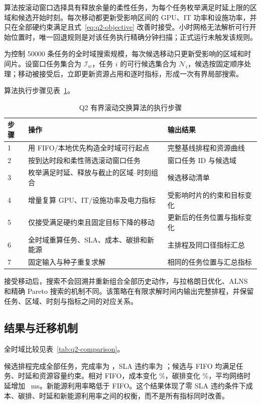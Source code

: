 算法按滚动窗口选择具有释放余量的柔性任务，为每个任务枚举满足时延上限的区域和候选开始时刻。每次移动都更新受影响区间的 GPU、IT 功率和设施功率，并只在全部硬约束满足且式~\eqref{eq:q2-objective} 改善时接受。小时网格无法解析可行开始位置时，唯一回退规则是对该任务执行精确分钟扫描；正式运行未触发该规则。

为控制 50000 条任务的全时域搜索规模，每次候选移动只更新受影响的区域和时间片。设窗口任务集合为 $\mathcal I_w$，任务 $i$ 的可行候选集合为 $\mathcal N_i$，候选按固定顺序处理；移动被接受后，立即更新资源占用和逐时指标，形成一次有界局部搜索。

算法执行步骤见表~\ref{tab:q2-algorithm}。

\begin{table}[H]
  \centering
  \caption{Q2 有界滚动交换算法的执行步骤}
  \label{tab:q2-algorithm}
  \small
  \begin{tabularx}{\textwidth}{p{}p{}X}
    \toprule
    步骤 & 操作 & 输出结果 \\
    \midrule
    1 & 用 FIFO/本地优先构造全时域可行起点 & 完整基线排程和资源曲线 \\
    2 & 按到达时段和柔性筛选滚动窗口任务 & 窗口任务 ID 与候选域 \\
    3 & 枚举满足时延、释放与截止的区域--时刻组合 & 候选移动清单 \\
    4 & 增量复算 GPU、IT/设施功率及电力指标 & 受影响时片的约束和目标变化 \\
    5 & 仅接受满足硬约束且固定目标下降的移动 & 更新后的任务位置与指标变化 \\
    6 & 全时域重算任务、SLA、成本、碳排和新能源 & 主排程及同口径指标汇总 \\
    7 & 固定输入与种子重复求解 & 相同的任务位置与汇总指标 \\
    \bottomrule
  \end{tabularx}
\end{table}

接受移动后，搜索不会回溯并重新组合全部历史动作，与拉格朗日优化、ALNS 和精确 Pareto 搜索的机制不同。该策略在有限求解时间内输出完整排程，并保留任务、区域、时刻与指标之间的对应关系。

\subsection{结果与迁移机制}

全时域比较见表~\ref{tab:q2-comparison}。

\TableQTwoComparison

候选排程完成全部任务，完成率为 ，SLA 违约率为 ；候选与 FIFO 均满足任务、时延和资源容量约束。相对 FIFO，成本变化 \%，碳排变化 \%，平均网络时延增加 ~ms。新能源利用率略低于 FIFO。这个结果体现了零 SLA 违约条件下成本、碳排、时延和新能源利用率之间的权衡，而不是所有指标同时改善。

